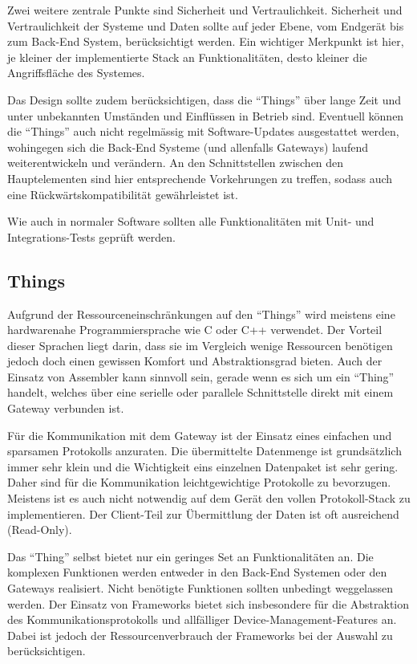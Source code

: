 Zwei weitere zentrale Punkte sind Sicherheit und Vertraulichkeit. Sicherheit und Vertraulichkeit der Systeme und Daten sollte auf jeder Ebene, vom Endgerät bis zum Back-End System, berücksichtigt werden. Ein wichtiger Merkpunkt ist hier, je kleiner der implementierte Stack an Funktionalitäten, desto kleiner die Angriffsfläche des Systemes.

Das Design sollte zudem berücksichtigen, dass die "`Things"' über lange Zeit und unter unbekannten Umständen und Einflüssen in Betrieb sind. Eventuell können die "`Things"' auch nicht regelmässig mit Software-Updates ausgestattet werden, wohingegen sich die Back-End Systeme (und allenfalls Gateways) laufend weiterentwickeln und verändern. An den Schnittstellen zwischen den Hauptelementen sind hier entsprechende Vorkehrungen zu treffen, sodass auch eine Rückwärtskompatibilität gewährleistet ist.

Wie auch in normaler Software sollten alle Funktionalitäten mit Unit- und Integrations-Tests geprüft werden.

\subsection{Things}
Aufgrund der Ressourceneinschränkungen auf den "`Things"' wird meistens eine hardwarenahe Programmiersprache wie C oder C++ verwendet. Der Vorteil dieser Sprachen liegt darin, dass sie im Vergleich wenige Ressourcen benötigen jedoch doch einen gewissen Komfort und Abstraktionsgrad bieten. Auch der Einsatz von Assembler kann sinnvoll sein, gerade wenn es sich um ein "`Thing"' handelt, welches über eine serielle oder parallele Schnittstelle direkt mit einem Gateway verbunden ist.

Für die Kommunikation mit dem Gateway ist der Einsatz eines einfachen und sparsamen Protokolls anzuraten. Die übermittelte Datenmenge ist grundsätzlich immer sehr klein und die Wichtigkeit eins einzelnen Datenpaket ist sehr gering. Daher sind für die Kommunikation leichtgewichtige Protokolle zu bevorzugen. Meistens ist es auch nicht notwendig auf dem Gerät den vollen Protokoll-Stack zu implementieren. Der Client-Teil zur Übermittlung der Daten ist oft ausreichend (Read-Only).

Das "`Thing"' selbst bietet nur ein geringes Set an Funktionalitäten an. Die komplexen Funktionen werden entweder in den Back-End Systemen oder den Gateways realisiert. Nicht benötigte Funktionen sollten unbedingt weggelassen werden. Der Einsatz von Frameworks bietet sich insbesondere für die Abstraktion des Kommunikationsprotokolls und allfälliger Device-Management-Features an. Dabei ist jedoch der Ressourcenverbrauch der Frameworks bei der Auswahl zu berücksichtigen.

